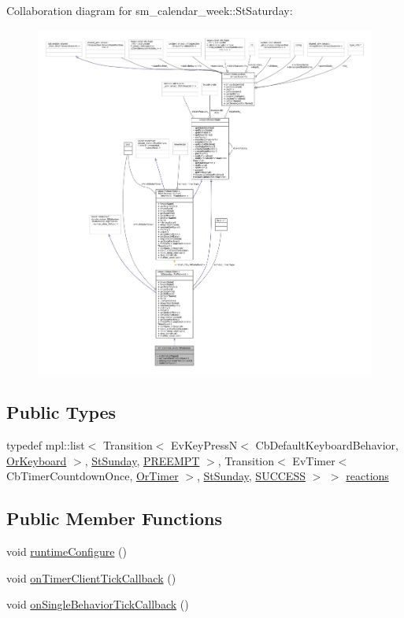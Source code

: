 Collaboration diagram for sm\+\_\+calendar\+\_\+week\+:\+:St\+Saturday\+:
\nopagebreak
\begin{figure}[H]
\begin{center}
\leavevmode
\includegraphics[width=350pt]{structsm__calendar__week_1_1StSaturday__coll__graph}
\end{center}
\end{figure}
\subsection*{Public Types}
\begin{DoxyCompactItemize}
\item 
typedef mpl\+::list$<$ Transition$<$ Ev\+Key\+PressN$<$ Cb\+Default\+Keyboard\+Behavior, \hyperlink{classsm__calendar__week_1_1OrKeyboard}{Or\+Keyboard} $>$, \hyperlink{structsm__calendar__week_1_1StSunday}{St\+Sunday}, \hyperlink{classPREEMPT}{P\+R\+E\+E\+M\+PT} $>$, Transition$<$ Ev\+Timer$<$ Cb\+Timer\+Countdown\+Once, \hyperlink{classsm__calendar__week_1_1OrTimer}{Or\+Timer} $>$, \hyperlink{structsm__calendar__week_1_1StSunday}{St\+Sunday}, \hyperlink{classSUCCESS}{S\+U\+C\+C\+E\+SS} $>$ $>$ \hyperlink{structsm__calendar__week_1_1StSaturday_a8c581c22cf6a32adec475c5caadd4b16}{reactions}
\end{DoxyCompactItemize}
\subsection*{Public Member Functions}
\begin{DoxyCompactItemize}
\item 
void \hyperlink{structsm__calendar__week_1_1StSaturday_a3552be67b39ddaec030b7efc8909741b}{runtime\+Configure} ()
\item 
void \hyperlink{structsm__calendar__week_1_1StSaturday_a6723b8838cba941546ab4e82579cdf8b}{on\+Timer\+Client\+Tick\+Callback} ()
\item 
void \hyperlink{structsm__calendar__week_1_1StSaturday_aed7bdd2807a17906d8c107c821117448}{on\+Single\+Behavior\+Tick\+Callback} ()
\end{DoxyCompactItemize}

